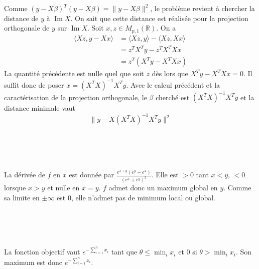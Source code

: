\documentclass{report}
\DeclareMathOperator{\im}{Im}
\begin{document}
\subsection{} \noindent{}\\ 
\\ 
\\
\noindent Comme $(y-X\beta)^T(y-X\beta)= \|y-X\beta\|^2$, le problème revient à chercher la distance de $y$ à $\im X$.\newline
On sait que cette distance est réalisée pour la projection orthogonale de $y$ sur $\im X$. Soit $x,z \in M_{p,1}(\mathbb R)$. On a 
$$\begin{aligned}
\langle Xz, y - Xx \rangle &= \langle Xz,y \rangle - \langle Xz,Xx \rangle \\
&= z^TX^Ty - z^TX^TXx\\ 
&= z^T(X^Ty - X^TXx)
\end{aligned}$$
La quantité précédente est nulle quel que soit $z$ dès lors que $X^Ty - X^TXx=0$. Il suffit donc de poser $x=(X^TX)^{-1}X^Ty$.\newline
Avec le calcul précédent et la caractérisation de la projection orthogonale, le $\beta$ cherché est $(X^TX)^{-1}X^Ty$ et la distance minimale vaut $$\|y-X(X^TX)^{-1}X^Ty\|^2$$

\subsection{} \noindent{}\\ 
\\ 
\\
\noindent La dérivée de $f$ en $x$ est donnée par $\displaystyle \frac{e^{x+y} \left(e^y-e^x\right)}{\left(e^x+e^y\right)^3}$.\newline
Elle est $>0$ tant $x< y$, $<0$ lorsque $x> y$ et nulle en $x=y$. $f$ admet donc un maximum global en $y$. Comme sa limite en $\pm \infty$ est $0$, elle n'admet pas de minimum local ou global.\newline

\subsection{} \noindent{}\\ 
\\ 
\\
\noindent La fonction objectif vaut $e^{-\sum_{i=1}^n x_i}$ tant que $\theta \leq \min_i x_i$ et $0$ si $\theta > \min_i x_i$. Son maximum est donc $e^{-\sum_{i=1}^n x_i}$. 
\end{document}
